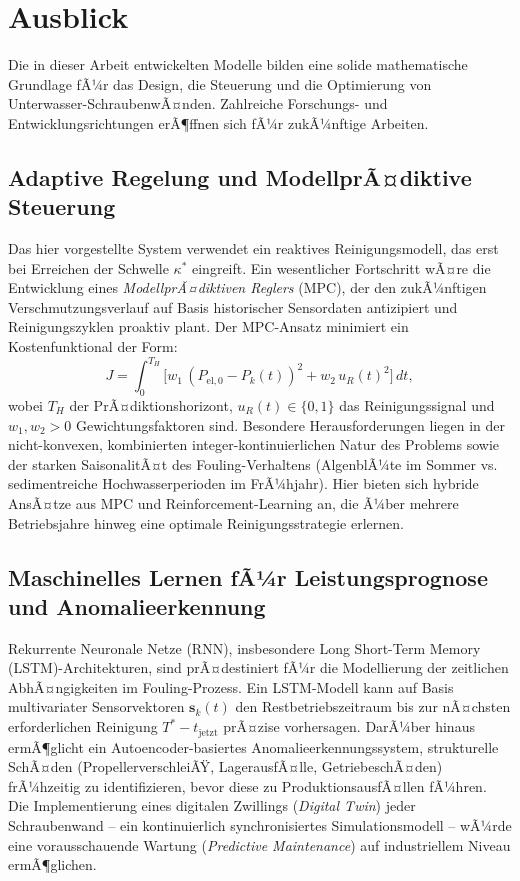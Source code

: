 ﻿\documentclass[a4paper,12pt]{article}
\theoremstyle{definition}
\begin{document}
\section{Ausblick}

Die in dieser Arbeit entwickelten Modelle bilden eine solide mathematische Grundlage
fÃ¼r das Design, die Steuerung und die Optimierung von Unterwasser-SchraubenwÃ¤nden.
Zahlreiche Forschungs- und Entwicklungsrichtungen erÃ¶ffnen sich fÃ¼r zukÃ¼nftige Arbeiten.

\subsection{Adaptive Regelung und ModellprÃ¤diktive Steuerung}

Das hier vorgestellte System verwendet ein reaktives Reinigungsmodell, das erst
bei Erreichen der Schwelle $\kappa^*$ eingreift. Ein wesentlicher Fortschritt wÃ¤re
die Entwicklung eines \emph{ModellprÃ¤diktiven Reglers} (MPC), der den zukÃ¼nftigen
Verschmutzungsverlauf auf Basis historischer Sensordaten antizipiert und Reinigungszyklen
proaktiv plant. Der MPC-Ansatz minimiert ein Kostenfunktional der Form:
\[
  J = \int_0^{T_H} \bigl[ w_1\,(P_{\mathrm{el},0} - P_k(t))^2 + w_2\,u_R(t)^2 \bigr]\,dt,
\]
wobei $T_H$ der PrÃ¤diktionshorizont, $u_R(t) \in \{0,1\}$ das Reinigungssignal und
$w_1, w_2 > 0$ Gewichtungsfaktoren sind. Besondere Herausforderungen liegen in der
nicht-konvexen, kombinierten integer-kontinuierlichen Natur des Problems sowie der
starken SaisonalitÃ¤t des Fouling-Verhaltens (AlgenblÃ¼te im Sommer vs. sedimentreiche
Hochwasserperioden im FrÃ¼hjahr). Hier bieten sich hybride AnsÃ¤tze aus MPC und
Reinforcement-Learning an, die Ã¼ber mehrere Betriebsjahre hinweg eine optimale
Reinigungsstrategie erlernen.

\subsection{Maschinelles Lernen fÃ¼r Leistungsprognose und Anomalieerkennung}

Rekurrente Neuronale Netze (RNN), insbesondere Long Short-Term Memory (LSTM)-Architekturen,
sind prÃ¤destiniert fÃ¼r die Modellierung der zeitlichen AbhÃ¤ngigkeiten im
Fouling-Prozess. Ein LSTM-Modell kann auf Basis multivariater Sensorvektoren
$\mathbf{s}_k(t)$ den Restbetriebszeitraum bis zur nÃ¤chsten erforderlichen Reinigung
$T^* - t_{\mathrm{jetzt}}$ prÃ¤zise vorhersagen. DarÃ¼ber hinaus ermÃ¶glicht ein
Autoencoder-basiertes Anomalieerkennungssystem, strukturelle SchÃ¤den (PropellerverschleiÃŸ,
LagerausfÃ¤lle, GetriebeschÃ¤den) frÃ¼hzeitig zu identifizieren, bevor diese zu
ProduktionsausfÃ¤llen fÃ¼hren. Die Implementierung eines digitalen Zwillings
(\emph{Digital Twin}) jeder Schraubenwand -- ein kontinuierlich synchronisiertes
Simulationsmodell -- wÃ¼rde eine vorausschauende Wartung (\emph{Predictive Maintenance})
auf industriellem Niveau ermÃ¶glichen.
\end{document}
